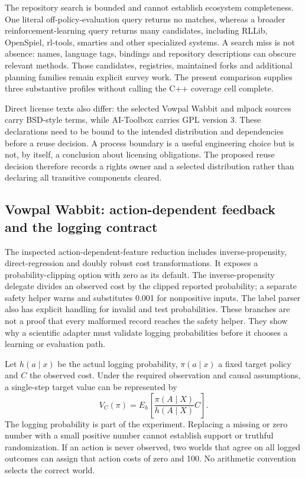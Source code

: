 The repository search is bounded and cannot establish ecosystem completeness. One literal off-policy-evaluation query returns no matches, whereas a broader reinforcement-learning query returns many candidates, including RLLib, OpenSpiel, rl-tools, smarties and other specialized systems. A search miss is not absence: names, language tags, bindings and repository descriptions can obscure relevant methods. Those candidates, registries, maintained forks and additional planning families remain explicit survey work. The present comparison supplies three substantive profiles without calling the C++ coverage cell complete.~\citep{exec24_policycxx_comparison}

Direct license texts also differ: the selected Vowpal Wabbit and mlpack sources carry BSD-style terms, while AI-Toolbox carries GPL version 3. These declarations need to be bound to the intended distribution and dependencies before a reuse decision. A process boundary is a useful engineering choice but is not, by itself, a conclusion about licensing obligations. The proposed reuse decision therefore records a rights owner and a selected distribution rather than declaring all transitive components cleared.~\citep{exec24_policycxx_vw,exec24_policycxx_aitoolbox,exec24_policycxx_mlpack,exec24_policycxx_comparison}

\subsection{Vowpal Wabbit: action-dependent feedback and the logging contract}
The inspected action-dependent-feature reduction includes inverse-propensity, direct-regression and doubly robust cost transformations. It exposes a probability-clipping option with zero as its default. The inverse-propensity delegate divides an observed cost by the clipped reported probability; a separate safety helper warns and substitutes 0.001 for nonpositive inputs. The label parser also has explicit handling for invalid and test probabilities. These branches are not a proof that every malformed record reaches the safety helper. They show why a scientific adapter must validate logging probabilities before it chooses a learning or evaluation path.~\citep{exec24_policycxx_vw}

Let $h(a\mid x)$ be the actual logging probability, $\pi(a\mid x)$ a fixed target policy and $C$ the observed cost. Under the required observation and causal assumptions, a single-step target value can be represented by
\[
 V_C(\pi)=E_h\!\left[\frac{\pi(A\mid X)}{h(A\mid X)}C\right].
\]
The logging probability is part of the experiment. Replacing a missing or zero number with a small positive number cannot establish support or truthful randomization. If an action is never observed, two worlds that agree on all logged outcomes can assign that action costs of zero and 100. No arithmetic convention selects the correct world.~\citep{exec24_policycxx_cs2021,exec24_policycxx_anytime2024,exec24_policycxx_comparison}

